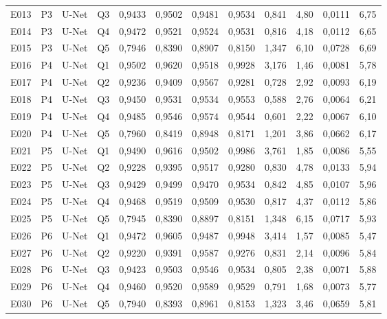 \begin{longtable}{lllllccccccc}
E013 & P3 & U-Net & Q3 & 0{,}9433 & 0{,}9502 & 0{,}9481 & 0{,}9534 & 0{,}841 & 4{,}80 & 0{,}0111 & 6{,}75 \\
E014 & P3 & U-Net & Q4 & 0{,}9472 & 0{,}9521 & 0{,}9524 & 0{,}9531 & 0{,}816 & 4{,}18 & 0{,}0112 & 6{,}65 \\
E015 & P3 & U-Net & Q5 & 0{,}7946 & 0{,}8390 & 0{,}8907 & 0{,}8150 & 1{,}347 & 6{,}10 & 0{,}0728 & 6{,}69 \\
E016 & P4 & U-Net & Q1 & 0{,}9502 & 0{,}9620 & 0{,}9518 & 0{,}9928 & 3{,}176 & 1{,}46 & 0{,}0081 & 5{,}78 \\
E017 & P4 & U-Net & Q2 & 0{,}9236 & 0{,}9409 & 0{,}9567 & 0{,}9281 & 0{,}728 & 2{,}92 & 0{,}0093 & 6{,}19 \\
E018 & P4 & U-Net & Q3 & 0{,}9450 & 0{,}9531 & 0{,}9534 & 0{,}9553 & 0{,}588 & 2{,}76 & 0{,}0064 & 6{,}21 \\
E019 & P4 & U-Net & Q4 & 0{,}9485 & 0{,}9546 & 0{,}9574 & 0{,}9544 & 0{,}601 & 2{,}22 & 0{,}0067 & 6{,}10 \\
E020 & P4 & U-Net & Q5 & 0{,}7960 & 0{,}8419 & 0{,}8948 & 0{,}8171 & 1{,}201 & 3{,}86 & 0{,}0662 & 6{,}17 \\
E021 & P5 & U-Net & Q1 & 0{,}9490 & 0{,}9616 & 0{,}9502 & 0{,}9986 & 3{,}761 & 1{,}85 & 0{,}0086 & 5{,}55 \\
E022 & P5 & U-Net & Q2 & 0{,}9228 & 0{,}9395 & 0{,}9517 & 0{,}9280 & 0{,}830 & 4{,}78 & 0{,}0133 & 5{,}94 \\
E023 & P5 & U-Net & Q3 & 0{,}9429 & 0{,}9499 & 0{,}9470 & 0{,}9534 & 0{,}842 & 4{,}85 & 0{,}0107 & 5{,}96 \\
E024 & P5 & U-Net & Q4 & 0{,}9468 & 0{,}9519 & 0{,}9509 & 0{,}9530 & 0{,}817 & 4{,}37 & 0{,}0112 & 5{,}86 \\
E025 & P5 & U-Net & Q5 & 0{,}7945 & 0{,}8390 & 0{,}8897 & 0{,}8151 & 1{,}348 & 6{,}15 & 0{,}0717 & 5{,}93 \\
E026 & P6 & U-Net & Q1 & 0{,}9472 & 0{,}9605 & 0{,}9487 & 0{,}9948 & 3{,}414 & 1{,}57 & 0{,}0085 & 5{,}47 \\
E027 & P6 & U-Net & Q2 & 0{,}9220 & 0{,}9391 & 0{,}9587 & 0{,}9276 & 0{,}831 & 2{,}14 & 0{,}0096 & 5{,}84 \\
E028 & P6 & U-Net & Q3 & 0{,}9423 & 0{,}9503 & 0{,}9546 & 0{,}9534 & 0{,}805 & 2{,}38 & 0{,}0071 & 5{,}88 \\
E029 & P6 & U-Net & Q4 & 0{,}9460 & 0{,}9520 & 0{,}9589 & 0{,}9529 & 0{,}791 & 1{,}68 & 0{,}0073 & 5{,}77 \\
E030 & P6 & U-Net & Q5 & 0{,}7940 & 0{,}8393 & 0{,}8961 & 0{,}8153 & 1{,}323 & 3{,}46 & 0{,}0659 & 5{,}81 \\

\end{longtable}
